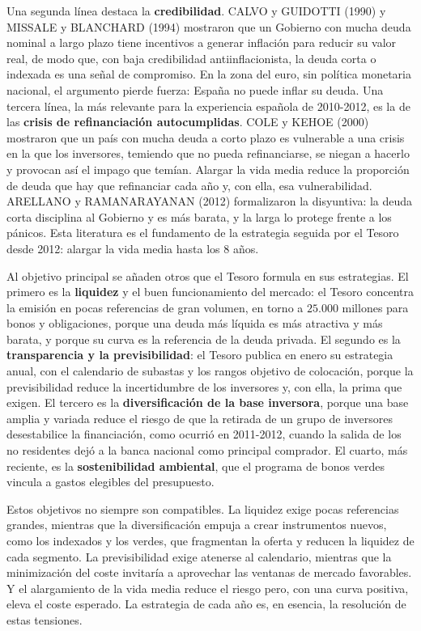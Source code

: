 \documentclass[10pt,a4paper]{article}
\begin{document}
Una segunda línea destaca la \textbf{credibilidad}. CALVO y GUIDOTTI (1990) y MISSALE y BLANCHARD (1994) mostraron que un Gobierno con mucha deuda nominal a largo plazo tiene incentivos a generar inflación para reducir su valor real, de modo que, con baja credibilidad antiinflacionista, la deuda corta o indexada es una señal de compromiso. En la zona del euro, sin política monetaria nacional, el argumento pierde fuerza: España no puede inflar su deuda. Una tercera línea, la más relevante para la experiencia española de 2010-2012, es la de las \textbf{crisis de refinanciación autocumplidas}. COLE y KEHOE (2000) mostraron que un país con mucha deuda a corto plazo es vulnerable a una crisis en la que los inversores, temiendo que no pueda refinanciarse, se niegan a hacerlo y provocan así el impago que temían. Alargar la vida media reduce la proporción de deuda que hay que refinanciar cada año y, con ella, esa vulnerabilidad. ARELLANO y RAMANARAYANAN (2012) formalizaron la disyuntiva: la deuda corta disciplina al Gobierno y es más barata, y la larga lo protege frente a los pánicos. Esta literatura es el fundamento de la estrategia seguida por el Tesoro desde 2012: alargar la vida media hasta los $8$ años.

Al objetivo principal se añaden otros que el Tesoro formula en sus estrategias. El primero es la \textbf{liquidez} y el buen funcionamiento del mercado: el Tesoro concentra la emisión en pocas referencias de gran volumen, en torno a $25.000$ millones para bonos y obligaciones, porque una deuda más líquida es más atractiva y más barata, y porque su curva es la referencia de la deuda privada. El segundo es la \textbf{transparencia y la previsibilidad}: el Tesoro publica en enero su estrategia anual, con el calendario de subastas y los rangos objetivo de colocación, porque la previsibilidad reduce la incertidumbre de los inversores y, con ella, la prima que exigen. El tercero es la \textbf{diversificación de la base inversora}, porque una base amplia y variada reduce el riesgo de que la retirada de un grupo de inversores desestabilice la financiación, como ocurrió en 2011-2012, cuando la salida de los no residentes dejó a la banca nacional como principal comprador. El cuarto, más reciente, es la \textbf{sostenibilidad ambiental}, que el programa de bonos verdes vincula a gastos elegibles del presupuesto.

Estos objetivos no siempre son compatibles. La liquidez exige pocas referencias grandes, mientras que la diversificación empuja a crear instrumentos nuevos, como los indexados y los verdes, que fragmentan la oferta y reducen la liquidez de cada segmento. La previsibilidad exige atenerse al calendario, mientras que la minimización del coste invitaría a aprovechar las ventanas de mercado favorables. Y el alargamiento de la vida media reduce el riesgo pero, con una curva positiva, eleva el coste esperado. La estrategia de cada año es, en esencia, la resolución de estas tensiones.
\end{document}
